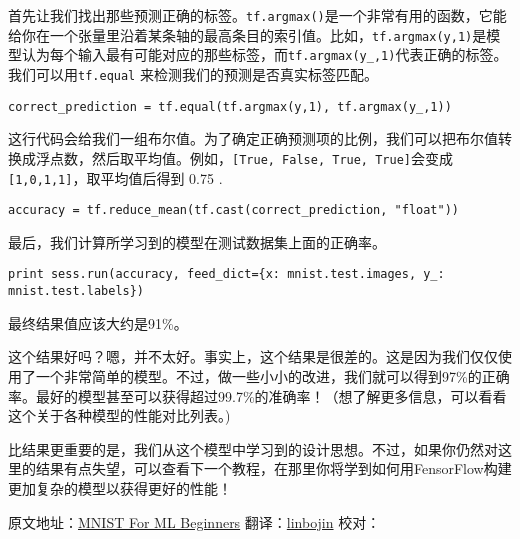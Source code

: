 首先让我们找出那些预测正确的标签。\lstinline{tf.argmax()}是一个非常有用的函数，它能给你在一个张量里沿着某条轴的最高条目的索引值。比如，\lstinline{tf.argmax(y,1)}是模型认为每个输入最有可能对应的那些标签，而\lstinline{tf.argmax(y_,1)}代表正确的标签。我们可以用\lstinline{tf.equal} 来检测我们的预测是否真实标签匹配。

\begin{lstlisting}
correct_prediction = tf.equal(tf.argmax(y,1), tf.argmax(y_,1))
\end{lstlisting}

这行代码会给我们一组布尔值。为了确定正确预测项的比例，我们可以把布尔值转换成浮点数，然后取平均值。例如，\lstinline{[True, False, True, True]}会变成\lstinline{[1,0,1,1]}，取平均值后得到 0.75 .

\begin{lstlisting}
accuracy = tf.reduce_mean(tf.cast(correct_prediction, "float"))
\end{lstlisting}

最后，我们计算所学习到的模型在测试数据集上面的正确率。

\begin{lstlisting}
print sess.run(accuracy, feed_dict={x: mnist.test.images, y_: mnist.test.labels})
\end{lstlisting}

最终结果值应该大约是91\%。

这个结果好吗？嗯，并不太好。事实上，这个结果是很差的。这是因为我们仅仅使用了一个非常简单的模型。不过，做一些小小的改进，我们就可以得到97\%的正确率。最好的模型甚至可以获得超过99.7\%的准确率！（想了解更多信息，可以看看这个关于各种模型的性能对比列表。)

比结果更重要的是，我们从这个模型中学习到的设计思想。不过，如果你仍然对这里的结果有点失望，可以查看下一个教程，在那里你将学到如何用FensorFlow构建更加复杂的模型以获得更好的性能！

原文地址：\href{http://tensorflow.org/tutorials/mnist/beginners/index.md}{MNIST For ML Beginners}
翻译：\href{https://github.com/linbojin}{linbojin} 校对：
